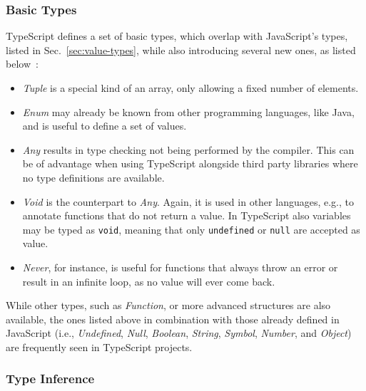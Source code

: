 \subsubsection{Basic Types}

TypeScript defines a set of basic types, which overlap with JavaScript's types, listed in Sec.~\ref{sec:value-types}, while also introducing several new ones, as listed below~\cite{TypeScriptHandbook:BasicTypes}:
\begin{itemize}
  \item \emph{Tuple} is a special kind of an array, only allowing a fixed number of elements.
  \item \emph{Enum} may already be known from other programming languages, like Java, and is useful to define a set of values.
  \item \emph{Any} results in type checking not being performed by the compiler. This can be of advantage when using TypeScript alongside third party libraries where no type definitions are available.
  \item \emph{Void} is the counterpart to \emph{Any}. Again, it is used in other languages, e.g., to annotate functions that do not return a value. In TypeScript also variables may be typed as \texttt{void}, meaning that only \texttt{undefined} or \texttt{null} are accepted as value.
  \item \emph{Never}, for instance, is useful for functions that always throw an error or result in an infinite loop, as no value will ever come back.
\end{itemize}
While other types, such as \emph{Function}, or more advanced structures are also available, the ones listed above in combination with those already defined in JavaScript (i.e., \emph{Undefined}, \emph{Null}, \emph{Boolean}, \emph{String}, \emph{Symbol}, \emph{Number}, and \emph{Object}) are frequently seen in TypeScript projects.

\subsubsection{Type Inference}

